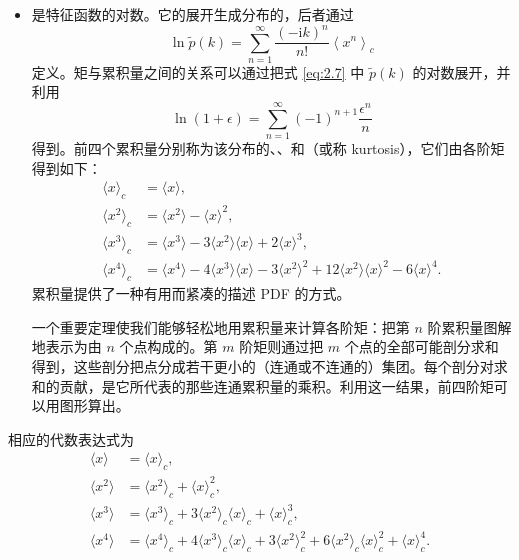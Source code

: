 \begin{itemize}[itemsep=0.45em,topsep=0.4em]
  \item {}是特征函数的对数。它的展开生成分布的，后者通过
  \begin{equation}\label{eq:2.9}
    \ln\tilde p(k)=\sum_{n=1}^{\infty}\frac{(-\mathrm{i}k)^n}{n!}\left\langle x^n\right\rangle_c
  \end{equation}
  定义。矩与累积量之间的关系可以通过把式 \eqref{eq:2.7} 中 $\tilde p(k)$ 的对数展开，并利用
  \begin{equation}\label{eq:2.10}
    \ln(1+\epsilon)=\sum_{n=1}^{\infty}(-1)^{n+1}\frac{\epsilon^n}{n}
  \end{equation}
  得到。前四个累积量分别称为该分布的、、和（或称 kurtosis），它们由各阶矩得到如下：
  \begin{equation}\label{eq:2.11}
    \begin{aligned}
      \langle x\rangle_c&=\langle x\rangle,\\
      \langle x^2\rangle_c&=\langle x^2\rangle-\langle x\rangle^2,\\
      \langle x^3\rangle_c&=\langle x^3\rangle-3\langle x^2\rangle\langle x\rangle+2\langle x\rangle^3,\\
      \langle x^4\rangle_c&=\langle x^4\rangle-4\langle x^3\rangle\langle x\rangle-3\langle x^2\rangle^2+12\langle x^2\rangle\langle x\rangle^2-6\langle x\rangle^4.
    \end{aligned}
  \end{equation}
  累积量提供了一种有用而紧凑的描述 PDF 的方式。

  一个重要定理使我们能够轻松地用累积量来计算各阶矩：把第 $n$ 阶累积量图解地表示为由 $n$ 个点构成的。第 $m$ 阶矩则通过把 $m$ 个点的全部可能剖分求和得到，这些剖分把点分成若干更小的（连通或不连通的）集团。每个剖分对求和的贡献，是它所代表的那些连通累积量的乘积。利用这一结果，前四阶矩可以用图形算出。
\end{itemize}


相应的代数表达式为
\begin{equation}\label{eq:2.12}
  \begin{aligned}
    \langle x\rangle&=\langle x\rangle_c,\\
    \langle x^2\rangle&=\langle x^2\rangle_c+\langle x\rangle_c^2,\\
    \langle x^3\rangle&=\langle x^3\rangle_c+3\langle x^2\rangle_c\langle x\rangle_c+\langle x\rangle_c^3,\\
    \langle x^4\rangle&=\langle x^4\rangle_c+4\langle x^3\rangle_c\langle x\rangle_c+3\langle x^2\rangle_c^2+6\langle x^2\rangle_c\langle x\rangle_c^2+\langle x\rangle_c^4.
  \end{aligned}
\end{equation}

